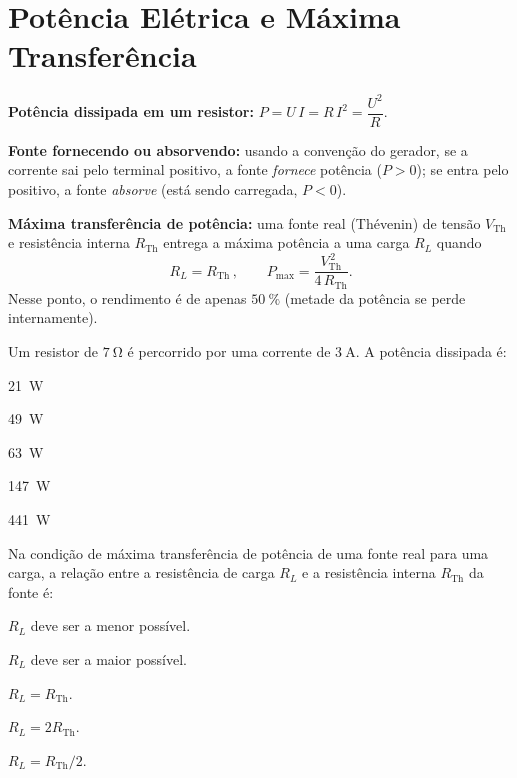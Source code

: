 \section{Potência Elétrica e Máxima Transferência}

\begin{conceito}
\textbf{Potência dissipada em um resistor:}
$P = U\,I = R\,I^2 = \dfrac{U^2}{R}$.\par
\textbf{Fonte fornecendo ou absorvendo:} usando a convenção do gerador, se a
corrente sai pelo terminal positivo, a fonte \emph{fornece} potência
($P>0$); se entra pelo positivo, a fonte \emph{absorve} (está sendo carregada,
$P<0$).\par
\textbf{Máxima transferência de potência:} uma fonte real (Thévenin) de tensão
$V_{\text{Th}}$ e resistência interna $R_{\text{Th}}$ entrega a máxima potência a
uma carga $R_L$ quando
\[
\boxed{\,R_L = R_{\text{Th}}\,},\qquad
P_{\max}=\frac{V_{\text{Th}}^{\,2}}{4\,R_{\text{Th}}}.
\]
Nesse ponto, o rendimento é de apenas $\SI{50}{\percent}$ (metade da potência se
perde internamente).
\end{conceito}

\legendaniveis

\blocofixacao

\begin{questao}[1]{}
Um resistor de $\SI{7}{\ohm}$ é percorrido por uma corrente de $\SI{3}{\ampere}$.
A potência dissipada é:
\begin{alternativas}[3]
\item \SI{21}{\watt}
\item \SI{49}{\watt}
\item \SI{63}{\watt}
\item \SI{147}{\watt}
\item \SI{441}{\watt}
\end{alternativas}
\end{questao}

\begin{questao}[1]{}
Na condição de máxima transferência de potência de uma fonte real para uma carga,
a relação entre a resistência de carga $R_L$ e a resistência interna
$R_{\text{Th}}$ da fonte é:
\begin{alternativas}
\item $R_L$ deve ser a menor possível.
\item $R_L$ deve ser a maior possível.
\item $R_L = R_{\text{Th}}$.
\item $R_L = 2R_{\text{Th}}$.
\item $R_L = R_{\text{Th}}/2$.
\end{alternativas}
\end{questao}

